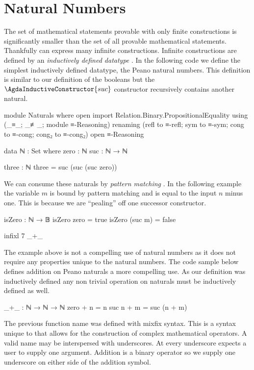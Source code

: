 \documentclass[./Thesis.tex]{subfiles}
\begin{document}
\section{Natural Numbers}
\label{sec:natural-numbers}
The set of mathematical statements provable with only finite constructions is
significantly smaller than the set of all provable mathematical statements.
Thankfully \Agda{} can express many infinite constructions\footnotemark{}.
Infinite constructions are defined by an \textit{inductively defined datatype}
\cite{agda}.
In the following code we define the simplest inductively defined datatype, the Peano
natural numbers. This definition is similar to our definition of the booleans
but the $\AgdaInductiveConstructor{suc}$ constructor recursively
contains another natural.
\begin{code}[hide]
  module Naturals where
    open import Relation.Binary.PropositionalEquality
      using (_≡_; _≢_; module ≡-Reasoning)
      renaming (refl to ≡-refl; sym to ≡-sym; cong to ≡-cong; cong₂ to ≡-cong₂)
    open ≡-Reasoning
\end{code}
\begin{code}
    data ℕ : Set where
      zero : ℕ
      suc  : ℕ → ℕ

    three : ℕ
    three = suc (suc (suc zero))
\end{code}
We can consume these naturals by \textit{pattern matching} \cite{agda}. In the
following example the variable $m$ is bound by pattern matching and is equal to
the input $n$ minus one. This is because we are ``pealing'' off one successor
constructor.
\begin{code}
    isZero : ℕ → 𝔹
    isZero zero = true
    isZero (suc m) = false
\end{code}
\begin{code}[hide]
    infixl 7 _+_
\end{code}
The example above is not a compelling use of natural numbers as it does not
require any properties unique to the natural numbers. The code sample
below defines addition on Peano naturals a more compelling use. As our definition was inductively
defined any non trivial operation on naturals must be inductively defined as
well.
\begin{code}
    _+_ : ℕ → ℕ → ℕ
    zero + n = n
    suc n + m = suc (n + m)
\end{code}
The previous function name was defined with mixfix syntax. This is a syntax unique
to \Agda{} that allows for the construction of complex mathematical operators. A
valid name may be interspersed with underscores. At every underscore \Agda{}
expects a user to supply one argument. Addition is a binary operator so we
supply one underscore on either side of the addition symbol. \\
\end{document}
